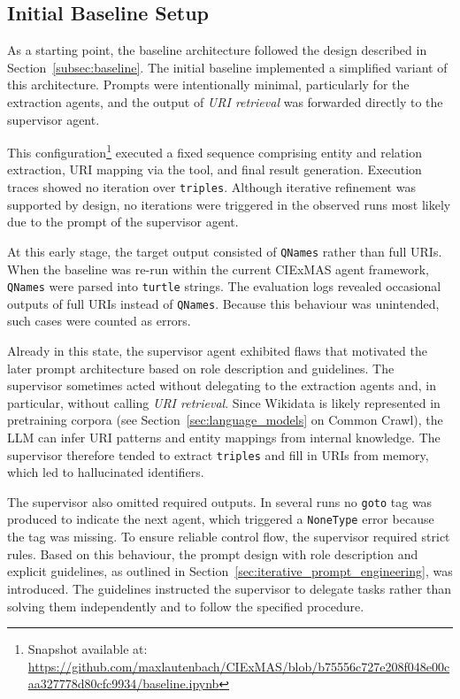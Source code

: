 \documentclass[a4paper,oneside,bibliography=totoc]{scrbook}
\begin{document}
\subsection{Initial Baseline Setup}
\label{subsec:initial_baseline_setup}

As a starting point, the baseline architecture followed the design described in Section~\ref{subsec:baseline}. The initial baseline implemented a simplified variant of this architecture. Prompts were intentionally minimal, particularly for the extraction agents, and the output of \textit{URI retrieval} was forwarded directly to the supervisor agent.

This configuration\footnote{Snapshot available at: \url{https://github.com/maxlautenbach/CIExMAS/blob/b75556c727e208f048e00caa327778d80cfc9934/baseline.ipynb}} executed a fixed sequence comprising entity and relation extraction, URI mapping via the tool, and final result generation. Execution traces showed no iteration over \texttt{triples}. Although iterative refinement was supported by design, no iterations were triggered in the observed runs most likely due to the prompt of the supervisor agent.

At this early stage, the target output consisted of \texttt{QNames} rather than full URIs. When the baseline was re-run within the current CIExMAS agent framework, \texttt{QNames} were parsed into \texttt{turtle} strings. The evaluation logs revealed occasional outputs of full URIs instead of \texttt{QNames}. Because this behaviour was unintended, such cases were counted as errors.

Already in this state, the supervisor agent exhibited flaws that motivated the later prompt architecture based on role description and guidelines. The supervisor sometimes acted without delegating to the extraction agents and, in particular, without calling \textit{URI retrieval}. Since Wikidata is likely represented in pretraining corpora (see Section~\ref{sec:language_models} on Common Crawl), the \ac{LLM} can infer URI patterns and entity mappings from internal knowledge. The supervisor therefore tended to extract \texttt{triples} and fill in URIs from memory, which led to hallucinated identifiers.

The supervisor also omitted required outputs. In several runs no \texttt{goto} tag was produced to indicate the next agent, which triggered a \texttt{NoneType} error because the tag was missing. To ensure reliable control flow, the supervisor required strict rules. Based on this behaviour, the prompt design with role description and explicit guidelines, as outlined in Section~\ref{sec:iterative_prompt_engineering}, was introduced. The guidelines instructed the supervisor to delegate tasks rather than solving them independently and to follow the specified procedure.
\end{document}
